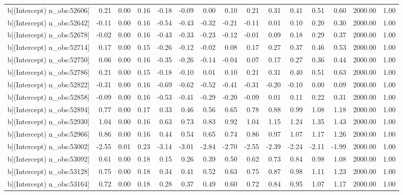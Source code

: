 \begin{table}[ht]
\begin{tabular}{rrrrrrrrrrrrrrr}
  b[(Intercept) n\_obs:52606] & 0.21 & 0.00 & 0.16 & -0.18 & -0.09 & 0.00 & 0.10 & 0.21 & 0.31 & 0.41 & 0.51 & 0.60 & 2000.00 & 1.00 \\ 
  b[(Intercept) n\_obs:52642] & -0.11 & 0.00 & 0.16 & -0.54 & -0.43 & -0.32 & -0.21 & -0.11 & 0.01 & 0.10 & 0.20 & 0.30 & 2000.00 & 1.00 \\ 
  b[(Intercept) n\_obs:52678] & -0.02 & 0.00 & 0.16 & -0.43 & -0.33 & -0.23 & -0.12 & -0.01 & 0.09 & 0.18 & 0.29 & 0.37 & 2000.00 & 1.00 \\ 
  b[(Intercept) n\_obs:52714] & 0.17 & 0.00 & 0.15 & -0.26 & -0.12 & -0.02 & 0.08 & 0.17 & 0.27 & 0.37 & 0.46 & 0.53 & 2000.00 & 1.00 \\ 
  b[(Intercept) n\_obs:52750] & 0.06 & 0.00 & 0.16 & -0.35 & -0.26 & -0.14 & -0.04 & 0.07 & 0.17 & 0.27 & 0.36 & 0.44 & 2000.00 & 1.00 \\ 
  b[(Intercept) n\_obs:52786] & 0.21 & 0.00 & 0.15 & -0.18 & -0.10 & 0.01 & 0.10 & 0.21 & 0.31 & 0.40 & 0.51 & 0.63 & 2000.00 & 1.00 \\ 
  b[(Intercept) n\_obs:52822] & -0.31 & 0.00 & 0.16 & -0.69 & -0.62 & -0.52 & -0.41 & -0.31 & -0.20 & -0.10 & 0.00 & 0.09 & 2000.00 & 1.00 \\ 
  b[(Intercept) n\_obs:52858] & -0.09 & 0.00 & 0.16 & -0.53 & -0.41 & -0.29 & -0.20 & -0.09 & 0.01 & 0.11 & 0.22 & 0.31 & 2000.00 & 1.00 \\ 
  b[(Intercept) n\_obs:52894] & 0.77 & 0.00 & 0.17 & 0.33 & 0.46 & 0.56 & 0.65 & 0.78 & 0.88 & 0.99 & 1.08 & 1.18 & 2000.00 & 1.00 \\ 
  b[(Intercept) n\_obs:52930] & 1.04 & 0.00 & 0.16 & 0.63 & 0.73 & 0.83 & 0.92 & 1.04 & 1.15 & 1.24 & 1.35 & 1.43 & 2000.00 & 1.00 \\ 
  b[(Intercept) n\_obs:52966] & 0.86 & 0.00 & 0.16 & 0.44 & 0.54 & 0.65 & 0.74 & 0.86 & 0.97 & 1.07 & 1.17 & 1.26 & 2000.00 & 1.00 \\ 
  b[(Intercept) n\_obs:53002] & -2.55 & 0.01 & 0.23 & -3.14 & -3.01 & -2.84 & -2.70 & -2.55 & -2.39 & -2.24 & -2.11 & -1.99 & 2000.00 & 1.00 \\ 
  b[(Intercept) n\_obs:53092] & 0.61 & 0.00 & 0.18 & 0.15 & 0.26 & 0.39 & 0.50 & 0.62 & 0.73 & 0.84 & 0.98 & 1.08 & 2000.00 & 1.00 \\ 
  b[(Intercept) n\_obs:53128] & 0.75 & 0.00 & 0.18 & 0.34 & 0.41 & 0.52 & 0.63 & 0.75 & 0.87 & 0.98 & 1.11 & 1.23 & 2000.00 & 1.00 \\ 
  b[(Intercept) n\_obs:53164] & 0.72 & 0.00 & 0.18 & 0.28 & 0.37 & 0.49 & 0.60 & 0.72 & 0.84 & 0.95 & 1.07 & 1.17 & 2000.00 & 1.00 \\ 

\end{tabular}
\end{table}
